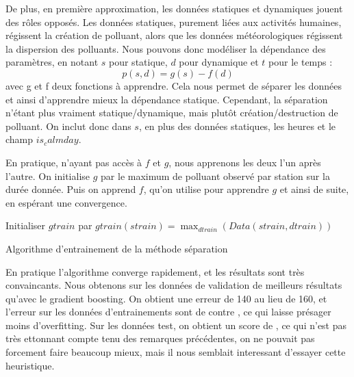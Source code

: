 De plus, en première approximation, les données statiques et dynamiques jouent des rôles opposés. Les données statiques, purement liées aux activités humaines, régissent la création de polluant, alors que les données météorologiques régissent la dispersion des polluants. Nous pouvons donc modéliser la dépendance des paramètres, en notant $s$ pour statique, $d$ pour dynamique et $t$ pour le temps : $$ p(s,d) = g(s) - f(d)$$ avec g et f deux fonctions à apprendre. Cela nous permet de séparer les données et ainsi d'apprendre mieux la dépendance statique. Cependant, la séparation n'étant plus vraiment statique/dynamique, mais plutôt création/destruction de polluant. On inclut donc dans $s$, en plus des données statiques, les heures et le champ $is_calmday$.

En pratique, n'ayant pas accès à $f$ et $g$, nous apprenons les deux l'un après l'autre. On initialise $g$ par le maximum de polluant observé par station sur la durée donnée. Puis on apprend $f$, qu'on utilise pour apprendre $g$ et ainsi de suite, en espérant une convergence. 

\begin{algorithm}[]
	Initialiser $gtrain$ par $gtrain(strain) = \max_{dtrain}(Data(strain,dtrain))$ \;
	\caption{Algorithme d'entrainement de la méthode séparation}
\end{algorithm}

En pratique l'algorithme converge rapidement, et les résultats sont très convaincants. Nous obtenons sur les données de validation de meilleurs résultats qu'avec le gradient boosting. On obtient une erreur de 140 au lieu de 160, et l'erreur sur les données d'entrainements sont de  contre , ce qui laisse présager moins d'overfitting. Sur les données test, on obtient un score de , ce qui n'est pas très ettonnant compte tenu des remarques précédentes, on ne pouvait pas forcement faire beaucoup mieux, mais il nous semblait interessant d'essayer cette heuristique.




